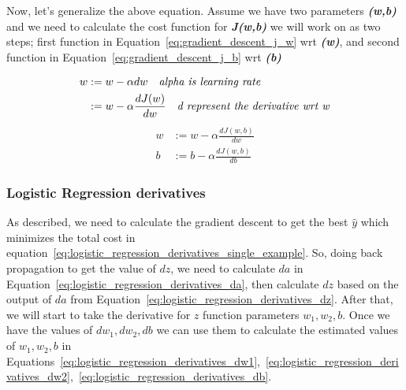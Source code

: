 Now, let's generalize the above equation. Assume we have two parameters \textbf{\textit{(w,b)}} and we need to calculate the cost function for \textbf{\textit{J(w,b)}} we will work on as two steps; first function in Equation~\eqref{eq:gradient_descent_j_w} wrt \textbf{\textit{(w)}}, and second function in Equation~\eqref{eq:gradient_descent_j_b} wrt \textbf{\textit{(b)}}

\begin{figure}[!t]
\subfigure[Derivative Example of function $f(x) = x^2$]{~\label{Fig:Derivative_Example}
}
\subfigure[Derivative Example of function $f(x) = x^2$ where $\alpha_1$ > $\alpha_2$]{\label{Fig:Alpha_Change}
}
\end{figure}


\begin{equation}\label{eq:gredient_descent_w}
 \begin{split}
  w & := w - \alpha dw \quad \text{\textit{alpha is learning rate}}\\
   & := w - \alpha \frac{dJ(w)}{dw} \quad \text{\textit{d represent the derivative wrt w}}
 \end{split}
\end{equation}
%
\begin{subequations}
   \begin{align}
w& := w - \alpha \frac{dJ(w,b)}{dw} \label{eq:gradient_descent_j_w}\\
b& := b - \alpha \frac{dJ(w,b)}{db} \label{eq:gradient_descent_j_b}
   \end{align}
  \end{subequations}
  
\subsubsection{Logistic Regression derivatives}\label{Sec:Logistic_Bp_Derivatives}

As described, we need to calculate the gradient descent to get the best $\widehat{y}$ which minimizes the total cost in equation~\eqref{eq:logistic_regression_derivatives_single_example}. So, doing back propagation to get the value of $dz$, we need to calculate $da$ in Equation~\eqref{eq:logistic_regression_derivatives_da}, then calculate $dz$ based on the output of $da$ from Equation~\eqref{eq:logistic_regression_derivatives_dz}. After that, we will start to take the derivative for $z$ function parameters \textbf{\textit{$w_1,w_2,b$}}. Once we have the values of \textbf{\textit{$dw_1,dw_2,db$}} we can use them to calculate the estimated values of \textbf{\textit{$w_1,w_2,b$}} in Equations~\eqref{eq:logistic_regression_derivatives_dw1},~\eqref{eq:logistic_regression_derivatives_dw2},~\eqref{eq:logistic_regression_derivatives_db}.%

